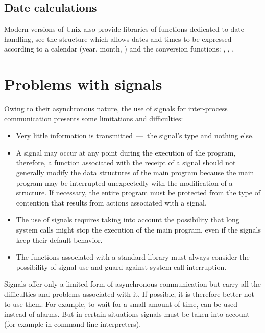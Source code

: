 \subsection* {Date calculations}

Modern versions of Unix also provide libraries of functions dedicated
to date handling, see the structure  which allows
dates and times to be expressed according to a calendar (year, month,
\etc) and the conversion functions: ,
, , \etc

\section{Problems with signals}

Owing to their asynchronous nature, the use of signals for inter-process communication 
presents some limitations and difficulties:
%
\begin{itemize}

\item Very little information is transmitted~---~the signal's
type and nothing else.

\item A signal may occur at any point during the execution 
of the program, therefore, a function associated with the receipt 
of a signal should not generally modify the data structures of 
the main program because the main program may be interrupted 
unexpectedly with the modification of a structure.  If necessary,
the entire program must be protected from the type of contention that
results from actions associated with a signal.

\item The use of signals requires taking into account the 
possibility that long system calls might stop the execution of the 
main program, even if the signals keep their default behavior.

\item The functions associated with a standard library must always 
consider the possibility of signal use and guard against system 
call interruption.

\end{itemize}
%

Signals offer only a limited form of asynchronous communication but
carry all the difficulties and problems associated with it. If possible,
it is therefore better not to use them. For example, to wait for a small
amount of time,  can be used instead of alarms. But
in certain situations signals must be taken into account (for example in
command line interpreters).

